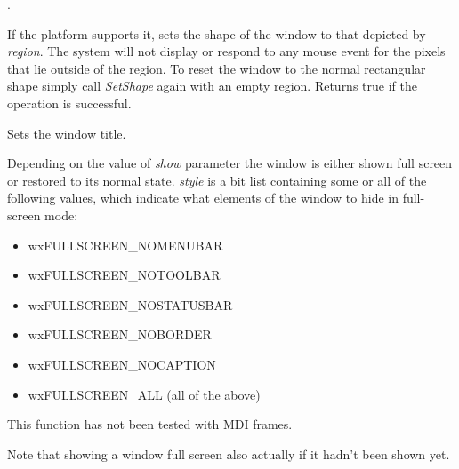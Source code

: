 




.


\label{wxtoplevelwindowsetshape}


If the platform supports it, sets the shape of the window to that
depicted by {\it region}.  The system will not display or
respond to any mouse event for the pixels that lie outside of the
region.  To reset the window to the normal rectangular shape simply
call {\it SetShape} again with an empty region.  Returns true if the
operation is successful.


\label{wxtoplevelwindowsettitle}


Sets the window title.






\label{wxtoplevelwindowshowfullscreen}


Depending on the value of {\it show} parameter the window is either shown full
screen or restored to its normal state. {\it style} is a bit list containing
some or all of the following values, which indicate what elements of the window
to hide in full-screen mode:

\begin{itemize}\itemsep=0pt
\item wxFULLSCREEN\_NOMENUBAR
\item wxFULLSCREEN\_NOTOOLBAR
\item wxFULLSCREEN\_NOSTATUSBAR
\item wxFULLSCREEN\_NOBORDER
\item wxFULLSCREEN\_NOCAPTION
\item wxFULLSCREEN\_ALL (all of the above)
\end{itemize}

This function has not been tested with MDI frames.

Note that showing a window full screen also actually
 if it hadn't been shown yet.


